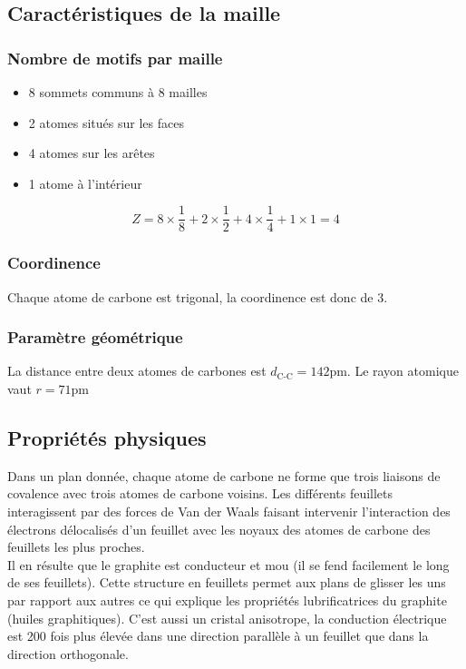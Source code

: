 \subsection{Caractéristiques de la maille}
\subsubsection{Nombre de motifs par maille}
\begin{itemize}
    \item 8 sommets communs à 8 mailles
    \item 2 atomes situés sur les faces
    \item 4 atomes sur les arêtes
    \item 1 atome à l'intérieur
\end{itemize}
\begin{equation}
    Z = 8 \times \frac{1}{8} + 2 \times \frac{1}{2} + 4 \times
    \frac{1}{4} + 1 \times 1 = 4
\end{equation}
\subsubsection{Coordinence}
Chaque atome de carbone est trigonal, la coordinence
est donc de 3.
\subsubsection{Paramètre géométrique}
La distance entre deux atomes de carbones est $d_\text{C-C} = 142$pm.
Le rayon atomique vaut $r = 71$pm

\subsection{Propriétés physiques}
Dans un plan donnée, chaque atome de carbone ne forme que trois
liaisons de covalence avec trois atomes de carbone voisins.
Les différents feuillets interagissent par des forces de Van der
Waals faisant intervenir l'interaction des électrons délocalisés
d'un feuillet avec les noyaux des atomes de carbone des feuillets
les plus proches.\\
Il en résulte que le graphite est conducteur et mou (il se fend
facilement le long de ses feuillets).
Cette structure en feuillets permet aux plans de glisser les uns
par rapport aux autres ce qui explique les propriétés lubrificatrices
du graphite (huiles graphitiques). C'est aussi un cristal anisotrope,
la conduction électrique est 200 fois plus élevée dans une direction
parallèle à un feuillet que dans la direction orthogonale.


